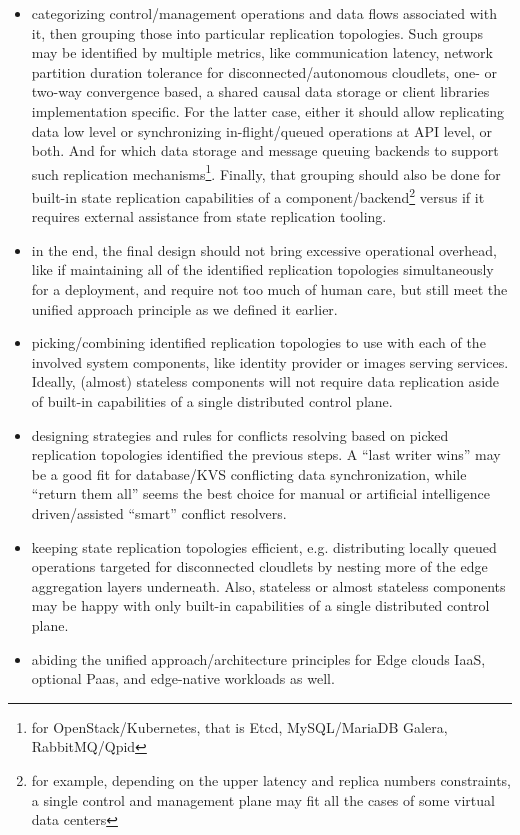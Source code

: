\documentclass[conference]{IEEEtran}
\begin{document}
\begin{itemize}
  \item categorizing control/management operations and data flows associated
    with it, then grouping those into particular replication topologies. Such
    groups may be identified by multiple metrics, like communication latency,
    network partition duration tolerance for disconnected/autonomous cloudlets,
    one- or two-way convergence based, a shared causal data storage or client
    libraries implementation specific. For the latter case, either it should
    allow replicating data low level or synchronizing in-flight/queued
    operations at API level, or both. And for which data storage and message
    queuing backends to support such replication mechanisms\footnote{for
    OpenStack/Kubernetes, that is Etcd, MySQL/MariaDB Galera, RabbitMQ/Qpid}.
    Finally, that grouping should also be done for built-in state replication
    capabilities of a component/backend\footnote{for example, depending on the
    upper latency and replica numbers constraints, a single control and
    management plane may fit all the cases of some virtual data
    centers\cite{b3}} versus if it requires external assistance from state
    replication tooling.
  \item in the end, the final design should not bring excessive operational
    overhead, like if maintaining all of the identified replication topologies
    simultaneously for a deployment, and require not too much of human care,
    but still meet the unified approach principle as we defined it earlier.
  \item picking/combining identified replication topologies to use with each of
    the involved system components, like identity provider or images serving
    services. Ideally, (almost) stateless components will not require data
    replication aside of built-in capabilities of a single distributed control
    plane.
  \item designing strategies and rules for conflicts resolving based on picked
    replication topologies identified the previous steps. A ``last writer
    wins'' may be a good fit for database/KVS conflicting data synchronization,
    while ``return them all'' seems the best choice for manual or artificial
    intelligence driven/assisted ``smart'' conflict resolvers.
  \item keeping state replication topologies efficient, e.g. distributing
    locally queued operations targeted for disconnected cloudlets by nesting
    more of the edge aggregation layers underneath. Also, stateless or almost
    stateless components may be happy with only built-in capabilities of a
    single distributed control plane.
  \item abiding the unified approach/architecture principles for Edge clouds
    IaaS, optional Paas, and edge-native workloads as well.
\end{itemize}
\end{document}
